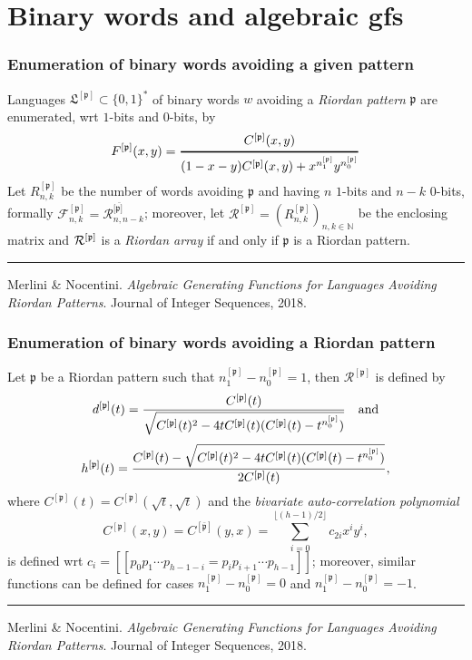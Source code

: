 \documentclass[9pt]{beamer}
\begin{document}
\section{Binary words and algebraic gfs}

\begin{frame}[fragile]
\frametitle{Enumeration of binary words avoiding a given pattern}

Languages $\mathfrak{L}^{[\mathfrak{p}]}\subset \{0,1\}^*$ of binary words $w$
avoiding a \textit{Riordan pattern} $\mathfrak{p}$ are enumerated,
wrt $1$-bits and $0$-bits, by
$$F^{[\mathfrak{p}]}(x,y)
=\genfrac{}{}{1pt}{0}{C^{[\mathfrak{p}]}(x,y)}{(1-x-y)C^{[\mathfrak{p}]}(x,y)
+x^{n_1^{[\mathfrak{p}]}}y^{n_0^{[\mathfrak{p}]}}}$$
Let $R_{n,k}^{[\mathfrak{p}]}$ be the number of words avoiding $\mathfrak{p}$
and having $n$ $1$-bits  and $n-k$  $0$-bits, formally
${\mathcal{F}_{n,k}^{[\mathfrak{p}]}} = {\mathcal{R}_{n,
n-k}^{[\bar{\mathfrak{p}]}}}$; moreover, let
$\mathcal{R}^{[\mathfrak{p}]}=\left(R_{n,k}^{[\mathfrak{p}]}\right)_{n,k\in\mathbb{N}}$
be the enclosing matrix and ${\cal{R}^{[\mathfrak{p}]}}$ is a
\textit{Riordan array} if and only if  $\mathfrak{p}$ is a Riordan pattern.
\vfill
\noindent\rule{\textwidth}{0.1pt}
{\footnotesize
Merlini \& Nocentini. \textit{Algebraic Generating Functions for Languages
Avoiding Riordan Patterns}.  Journal of Integer Sequences, 2018.}
\end{frame}

\begin{frame}[fragile]
\frametitle{Enumeration of binary words avoiding a Riordan pattern}

Let $\mathfrak{p}$ be a Riordan pattern
such that $n_1^{[\mathfrak{p}]}-n_0^{[\mathfrak{p}]}=1$, then
$\mathcal{R}^{\left[\mathfrak{p}\right]}$ is defined by
$$d^{[\mathfrak{p}]}(t)={C^{[\mathfrak{p}]}(t)
\over \sqrt{C^{[\mathfrak{p}]}(t)^2-4tC^{[\mathfrak{p}]}(t)(C^{[\mathfrak{p}]}(t)-t^{n_0^{[\mathfrak{p}]}})}}\quad\text{and}$$
$$h^{[\mathfrak{p}]}(t)={C^{[\mathfrak{p}]}(t) -\sqrt{C^{[\mathfrak{p}]}(t)^2-4tC^{[\mathfrak{p}]}(t)(C^{[\mathfrak{p}]}(t)-t^{n_0^{[\mathfrak{p}]}})}
\over 2 C^{[\mathfrak{p}]}(t)},$$
where $C^{[\mathfrak{p}]}(t)=C^{[\mathfrak{p}]}(\sqrt{t},\sqrt{t})$
and the \textit{bivariate auto-correlation polynomial}
\begin{displaymath}
C^{[\mathfrak{p}]}(x,y)=C^{[\mathfrak{\bar{p}}]}(y,x)=\sum_{i=0}^{\lfloor(h-1)/2\rfloor}c_{2i}x^iy^i,
\end{displaymath}
is defined wrt $c_i=[\![p_0p_1\cdots p_{h-1-i}=p_{i}p_{i+1}\cdots p_{h-1}]\!]$;
moreover, similar functions can be defined for cases
$n_1^{[\mathfrak{p}]}-n_0^{[\mathfrak{p}]}=0$ and
$n_1^{[\mathfrak{p}]}-n_0^{[\mathfrak{p}]}=-1$.

\vfill
\noindent\rule{\textwidth}{0.1pt}
{\footnotesize
Merlini \& Nocentini. \textit{Algebraic Generating Functions for Languages
Avoiding Riordan Patterns}.  Journal of Integer Sequences, 2018.}
\end{frame}
\end{document}
